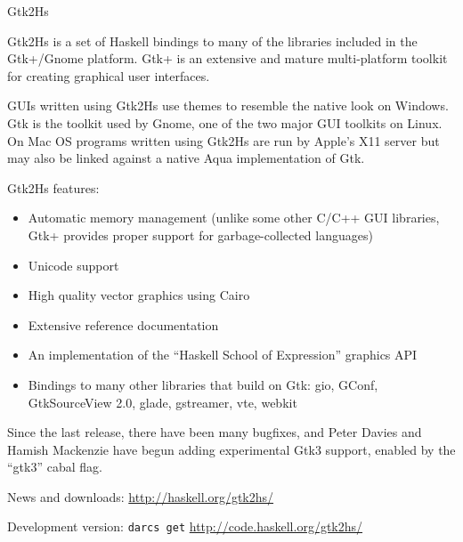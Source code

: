\begin{hcarentry}[updated]{Gtk2Hs}
\label{gtk2hs}
\makeheader

Gtk2Hs is a set of Haskell bindings to many of the libraries included
in the Gtk+/Gnome platform. Gtk+ is an extensive and mature
multi-platform toolkit for creating graphical user interfaces.

GUIs written using Gtk2Hs use themes to resemble the native look on
Windows. Gtk is the toolkit used by Gnome, one of the two major GUI toolkits
on Linux. On Mac OS programs written using Gtk2Hs are run by Apple's
X11 server but may also be linked against a native Aqua implementation
of Gtk.

\Separate
Gtk2Hs features:
\begin{itemize}
\item Automatic memory management (unlike some other C/C++ GUI
libraries, Gtk+ provides proper support for garbage-collected languages)
\item Unicode support
\item High quality vector graphics using Cairo
\item Extensive reference documentation
\item An implementation of the ``Haskell School of Expression'' graphics
API
\item Bindings to many other libraries that build on Gtk: gio, GConf,
  GtkSourceView 2.0, glade, gstreamer, vte, webkit
\end{itemize}

\Separate

Since the last release, there have been many bugfixes, and Peter Davies and
Hamish Mackenzie have begun adding experimental Gtk3 support, enabled by the
``gtk3'' cabal flag.

\FurtherReading
\begin{compactitem}
\item News and downloads:
  \url{http://haskell.org/gtk2hs/}

\item Development version:
  \texttt{darcs get} \url{http://code.haskell.org/gtk2hs/}
\end{compactitem}
\end{hcarentry} 
